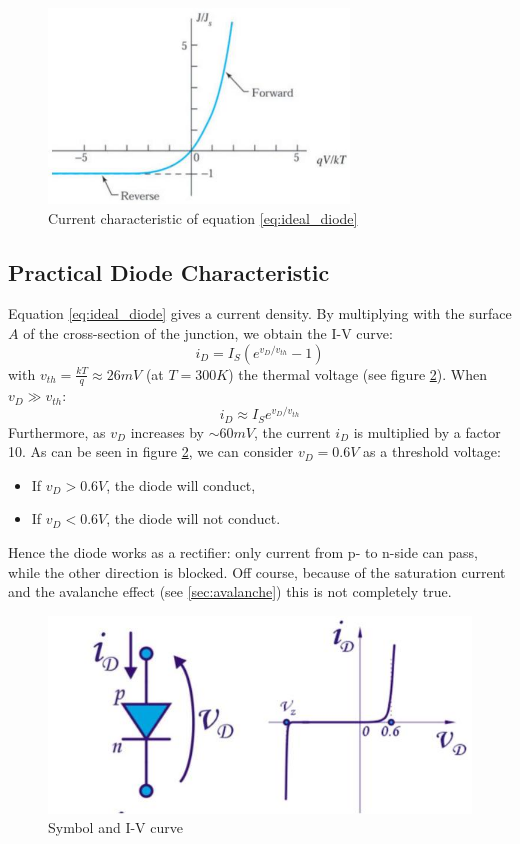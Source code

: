 \begin{figure}[h!]
\centering
\includegraphics[width=8cm]{figures/ch01/diode_charac.jpg}
\caption{Current characteristic of equation \ref{eq:ideal_diode}}
\label{fig:diode_charac}
\end{figure}

\subsection{Practical Diode Characteristic}
Equation \ref{eq:ideal_diode} gives a current density. By multiplying with the surface $A$ of the cross-section of the junction, we obtain the I-V curve:
\begin{equation}
i_D = I_S(e^{v_D/v_{th}} - 1)
\label{eq:idiode_IV}
\end{equation} 
with $v_{th} = \frac{kT}{q} \approx 26 mV$ (at $T=300K$) the thermal voltage (see figure \ref{fig:diode_charac2}). When $v_D \gg v_{th}$:
\begin{equation}
i_D \approx I_S e^{v_D/v_{th}}
\end{equation} 
Furthermore, as $v_D$ increases by $\sim 60 mV$, the current $i_D$ is multiplied by a factor 10. As can be seen in figure \ref{fig:diode_charac2}, we can consider $v_D = 0.6V$ as a threshold voltage:
\begin{itemize}
    \item If $v_D > 0.6V$, the diode will conduct,
    \item If $v_D < 0.6V$, the diode will not conduct.
\end{itemize}
Hence the diode works as a rectifier: only current from p- to n-side can pass, while the other direction is blocked. Off course, because of the saturation current and the avalanche effect (see \ref{sec:avalanche}) this is not completely true.

\begin{figure}[h!]
\centering
\includegraphics[width=12cm]{figures/ch01/diode_charac2.jpg}
\caption{Symbol and I-V curve} 
\label{fig:diode_charac2}
\end{figure}

